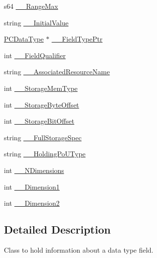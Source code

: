 \begin{DoxyCompactItemize}
\item 
s64 \hyperlink{classpc__emulator_1_1PCDataTypeField_a05e85a316b84c14f57fe59167e9a1685}{\+\_\+\+\_\+\+Range\+Max}
\item 
string \hyperlink{classpc__emulator_1_1PCDataTypeField_aed29902b81555d1af0ff3cd31e406cce}{\+\_\+\+\_\+\+Initial\+Value}
\item 
\hyperlink{classpc__emulator_1_1PCDataType}{P\+C\+Data\+Type} $\ast$ \hyperlink{classpc__emulator_1_1PCDataTypeField_ad64e3eb1b17c2f695f50e7a1fbc95b26}{\+\_\+\+\_\+\+Field\+Type\+Ptr}
\item 
int \hyperlink{classpc__emulator_1_1PCDataTypeField_a5eddd90856c1071bdf0a4baf30c4fa77}{\+\_\+\+\_\+\+Field\+Qualifier}
\item 
string \hyperlink{classpc__emulator_1_1PCDataTypeField_a2616ca0d712f1e0888b8baa9340041e8}{\+\_\+\+\_\+\+Associated\+Resource\+Name}
\item 
int \hyperlink{classpc__emulator_1_1PCDataTypeField_a7d4755f31dd2b641e7ea2fbbf9df82f6}{\+\_\+\+\_\+\+Storage\+Mem\+Type}
\item 
int \hyperlink{classpc__emulator_1_1PCDataTypeField_ad4175b87382c2c7eac3c59cf411196de}{\+\_\+\+\_\+\+Storage\+Byte\+Offset}
\item 
int \hyperlink{classpc__emulator_1_1PCDataTypeField_a0a83c264268f41b225a11e549b5309e7}{\+\_\+\+\_\+\+Storage\+Bit\+Offset}
\item 
string \hyperlink{classpc__emulator_1_1PCDataTypeField_a5817d10cfd121f7ba988c855ae9ec0fe}{\+\_\+\+\_\+\+Full\+Storage\+Spec}
\item 
string \hyperlink{classpc__emulator_1_1PCDataTypeField_a8cd4b224ca8d346eb32e5d7c89d59630}{\+\_\+\+\_\+\+Holding\+Po\+U\+Type}
\item 
int \hyperlink{classpc__emulator_1_1PCDataTypeField_aaa0cf080c4e649f740e03f2916725c15}{\+\_\+\+\_\+\+N\+Dimensions}
\item 
int \hyperlink{classpc__emulator_1_1PCDataTypeField_a69eaab2bf7fc7e82580c033991c232f8}{\+\_\+\+\_\+\+Dimension1}
\item 
int \hyperlink{classpc__emulator_1_1PCDataTypeField_abc3e341571affb8839a811dcb79f77ca}{\+\_\+\+\_\+\+Dimension2}
\end{DoxyCompactItemize}


\subsection{Detailed Description}
Class to hold information about a data type field. 

